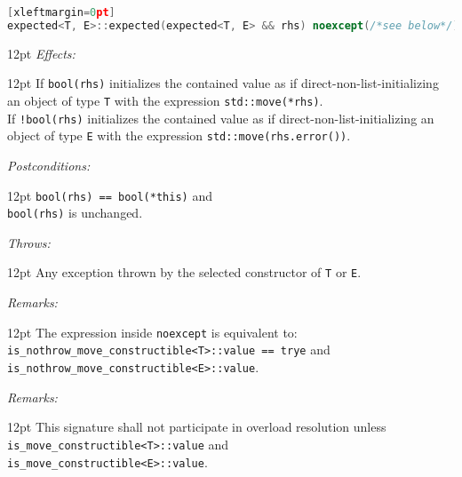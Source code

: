 \documentclass[a4paper,10pt]{article}
\newcommand{\cpp}[1]{\lstinline{#1}}
\newcommand{\wordingItem}[1]{\noindent\textit{#1:}}
\newenvironment{wordingTextItem}[1]{\wordingItem{#1}\vspace{2pt}\noindent\begin{adjustwidth}{12pt}{}}{\vspace{2pt}\end{adjustwidth}}
\newenvironment{wordingPara}{\begin{adjustwidth}{12pt}{}}{\end{adjustwidth}}
\begin{document}
\begin{lstlisting}[language=C++][xleftmargin=0pt]
expected<T, E>::expected(expected<T, E> && rhs) noexcept(/*see below*/);
\end{lstlisting}
\begin{wordingPara}
\begin{wordingTextItem}{Effects}
If \cpp{bool(rhs)} initializes the contained value as if direct-non-list-initializing an object of type \cpp{T} with the expression \cpp{std::move(*rhs)}. \\

\noindent
If \cpp{!bool(rhs)} initializes the contained value as if direct-non-list-initializing an object of type \cpp{E} with the expression \cpp{std::move(rhs.error())}.
\end{wordingTextItem}
\begin{wordingTextItem}{Postconditions}
\cpp{bool(rhs) == bool(*this)} and \\
\cpp{bool(rhs)} is unchanged.
\end{wordingTextItem}
\begin{wordingTextItem}{Throws}
Any exception thrown by the selected constructor of \cpp{T} or \cpp{E}.
\end{wordingTextItem}
\begin{wordingTextItem}{Remarks}
The expression inside \cpp{noexcept} is equivalent to:\\
\cpp{is_nothrow_move_constructible<T>::value == trye} and   \\
\cpp{is_nothrow_move_constructible<E>::value}.
\end{wordingTextItem}
\begin{wordingTextItem}{Remarks}
This signature shall not participate in overload resolution unless\\
\cpp{is_move_constructible<T>::value} and \\
\cpp{is_move_constructible<E>::value}.
\end{wordingTextItem}
\end{wordingPara}
\end{document}

